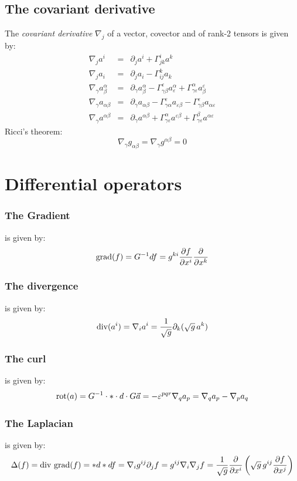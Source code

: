 \documentclass[twoside]{report}
\begin{document}
\subsection{The covariant derivative}
The {\it covariant derivative} $\nabla_j$ of a vector, covector and of
rank-2 tensors is given by:
\begin{eqnarray*}
\nabla_ja^i                  &=&\partial_ja^i+\Gamma^i_{jk}a^k\\
\nabla_ja_i                  &=&\partial_ja_i-\Gamma^k_{ij}a_k\\
\nabla_\gamma a^\alpha_\beta &=&\partial_\gamma a^\alpha_\beta -\Gamma^\varepsilon_{\gamma\beta} a^\alpha_\varepsilon+\Gamma^\alpha_{\gamma\varepsilon}a_\beta^\varepsilon\\
\nabla_\gamma a_{\alpha\beta}&=&\partial_\gamma a_{\alpha\beta}-\Gamma^\varepsilon_{\gamma\alpha}a_{\varepsilon\beta}-\Gamma^\varepsilon_{\gamma\beta}a_{\alpha\varepsilon}\\
\nabla_\gamma a^{\alpha\beta}&=&\partial_\gamma a^{\alpha\beta}+\Gamma^\alpha_{\gamma\varepsilon}a^{\varepsilon\beta}+\Gamma^\beta_{\gamma\varepsilon}a^{\alpha\varepsilon}
\end{eqnarray*}
Ricci's theorem:
\[
\nabla_\gamma g_{\alpha\beta}=\nabla_\gamma g^{\alpha\beta}=0
\]

\section{Differential operators}
\subsubsection{The Gradient}
is given by:
\[
{\rm grad}(f)=G^{-1}df=g^{ki}\frac{\partial f}{\partial x^i}\frac{\partial }{\partial x^k}
\]

\subsubsection{The divergence}
is given by:
\[
{\rm div}(a^i)=\nabla_ia^i=\frac{1}{\sqrt{g}}\partial_k(\sqrt{g}\,a^k)
\]

\subsubsection{The curl}
is given by:
\[
{\rm rot}(a)=G^{-1}\cdot*\cdot d\cdot G\vec{a}=-\varepsilon^{pqr}\nabla_qa_p=\nabla_qa_p-\nabla_pa_q
\]

\subsubsection{The Laplacian}
is given by:
\[
\Delta(f)={\rm div~grad}(f)=*d*df=\nabla_ig^{ij}\partial_jf=g^{ij}\nabla_i\nabla_jf=
\frac{1}{\sqrt{g}}\frac{\partial}{\partial x^i}\left(\sqrt{g}\,g^{ij}\frac{\partial f}{\partial x^j}\right)
\]
\end{document}
